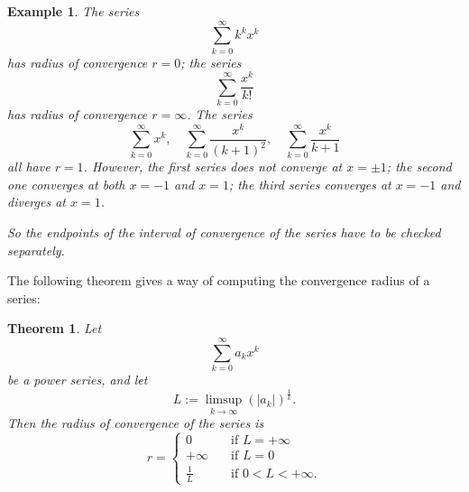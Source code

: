 \documentclass[a4paper,reqno]{amsart}
\numberwithin{equation}{section}
\newtheorem{theorem}[definition]{Theorem}
\newtheorem{example}{Example}
\begin{document}
\begin{example}
The series
$$
\sum_{k=0}^\infty k^k x^k
$$
has radius of convergence $r=0$; the series
$$
\sum_{k=0}^\infty \frac{x^k}{k!}
$$
has radius of convergence $r=\infty$.
The series
$$
\sum_{k=0}^\infty  x^k, \quad \sum_{k=0}^\infty  \frac{x^k}{(k+1)^2}, \quad \sum_{k=0}^\infty  \frac{x^k}{k+1}
$$
all have $r=1$. However, the first series does not converge at $x=\pm1$; the second one converges at both $x=-1$ and $x=1$; the third series converges at $x=-1$ and diverges at $x=1$.

So the endpoints of the interval of convergence of the series have to be checked separately.
\end{example}

The following theorem gives a way of computing the convergence radius of a series:

\begin{theorem}\label{thm:pointwisePS}
Let
$$
\sum_{k=0}^\infty a_k x^k
$$
be a power series, and let
$$
L:= \limsup_{k\to \infty} (|a_k|)^{\frac1k}.
$$
Then the radius of convergence of the series is
$$
r =
\begin{cases}
0 \quad &\textrm{if } L=+\infty\\
+\infty \quad &\textrm{if } L=0\\
\frac1L \quad &\textrm{if } 0<L<+\infty.
\end{cases}
$$
\end{theorem}
\end{document}
